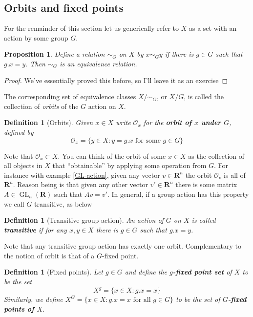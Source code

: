 \documentclass[12pt]{article}
\numberwithin{equation}{subsection}
\newtheorem{prop}[subsection]{Proposition}
\newtheorem{defn}[subsection]{Definition}
\theoremstyle{note}
\newcommand{\GL}{\operatorname{GL}}
\begin{document}
\subsection{Orbits and fixed points}
For the remainder of this section let us generically refer to $X$ as a set with an action by some group $G$.

\begin{prop} Define a relation $\sim_G$ on $X$ by $x\sim_G y$ if there is $g\in G$ such that $g.x=y$. Then $\sim_G$ is an equivalence relation.
\end{prop}

\begin{proof} We've essentially proved this before, so I'll leave it as an exercise \end{proof}

The corresponding set of equivalence classes $X/\sim_G$, or $X/G$, is called the collection of \textit{orbits} of the $G$ action on $X$. 

\begin{defn}[Orbits] \label{def-orbits} Given $x\in X$ write $\mathcal{O}_x$ for the \textbf{orbit of $x$ under $G$}, defined by \begin{equation}
	\mathcal{O}_x=\{y \in X : y=g.x \text{ for some $g\in G$}\} 
	\end{equation}
\end{defn}
Note that $\mathcal{O}_x\subset X$. You can think of the orbit of some $x\in X$ as the collection of all objects in $X$ that ``obtainable'' by applying some operation from $G$. For instance with example \ref{GL-action}, given any vector $v\in \mathbf{R}^n$ the orbit $\mathcal{O}_v$ is all of $\mathbf{R}^n$. Reason being is that given any other vector $v'\in\mathbf{R}^n$ there is some matrix $A\in \GL_n(\mathbf{R})$ such that $Av=v'$. In general, if a group action has this property we call $G$ transitive, as below

\begin{defn}[Transitive group action] \label{def-trans}
	An action of $G$ on $X$ is called \textbf{transitive} if for any $x,y\in X$ there is $g\in G$ such that $g.x=y$. 
\end{defn}	

Note that any transitive group action has exactly one orbit. Complementary to the notion of orbit is that of a $G$-fixed point. 

\begin{defn}[Fixed points]
	Let $g\in G$ and define the \textbf{$g$-fixed point set} of $X$ to be the set \begin{equation}
		X^g=\{ x\in X : g.x=x\}
	\end{equation}
	Similarly, we define $X^G=\{ x\in X: g.x=x \text{ for all $g\in G$}\}$ to be the set of \textbf{$G$-fixed points of $X$}. 
\end{defn}
\end{document}
